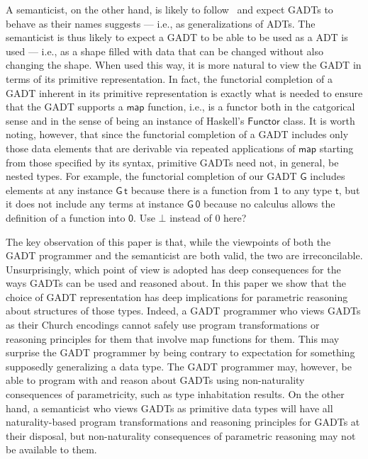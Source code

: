 \documentclass[acmsmall,screen,review,anonymous]{acmart}
\theoremstyle{definition}
\begin{document}
A semanticist, on the other hand, is likely to follow~\cite{bfss90}
and expect GADTs to behave as their names suggests --- i.e., as
generalizations of ADTs. The semanticist is thus likely to expect a
GADT to be able to be used as a ADT is used --- i.e., as a shape
filled with data that can be changed without also changing the
shape. When used this way, it is more natural to view the GADT in
terms of its primitive representation. In fact, the functorial
completion of a GADT inherent in its primitive representation is
exactly what is needed to ensure that the GADT supports a
$\mathsf{map}$ function, i.e., is a functor both in the catgorical
sense and in the sense of being an instance of Haskell's
$\mathsf{Functor}$ class.  It is worth noting, however, that since the
functorial completion of a GADT includes only those data elements that
are derivable via repeated applications of $\mathsf{map}$ starting
from those specified by its syntax, primitive GADTs need not, in
general, be nested types. For example, the functorial completion of
our GADT $\mathsf{G}$ includes elements at any instance
$\mathsf{G\,t}$ because there is a function from $\mathsf{1}$ to any
type $\mathsf{t}$, but it does not include any terms at instance
$\mathsf{G\,0}$ because no calculus allows the definition of a
function into $\mathsf{0}$. {\color{blue} Use $\bot$ instead of $0$
  here?}

The key observation of this paper is that, while the viewpoints of
both the GADT programmer and the semanticist are both valid, the two
are irreconcilable. Unsurprisingly, which point of view is adopted has
deep consequences for the ways GADTs can be used and reasoned
about. In this paper we show that the choice of GADT representation
has deep implications for parametric reasoning about structures of
those types. Indeed, a GADT programmer who views GADTs as their Church
encodings cannot safely use program transformations or reasoning
principles for them that involve map functions for them. This may
surprise the GADT programmer by being contrary to expectation for
something supposedly generalizing a data type. The GADT programmer
may, however, be able to program with and reason about GADTs using
non-naturality consequences of parametricity, such as type
inhabitation results. On the other hand, a semanticist who views GADTs
as primitive data types will have all naturality-based program
transformations and reasoning principles for GADTs at their disposal,
but non-naturality consequences of parametric reasoning may not be
available to them.
\end{document}
